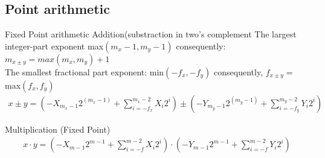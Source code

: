 \subsection{Point arithmetic}
\begin{parag}{Fixed Point arithmetic Addition(substraction in two's complement}
    The largest integer-part exponent max$(m_x - 1, m_y - 1)$ consequently: $m_{x \pm y} = max (m_x, m_y) + 1$
    \\
    The smallest fractional part exponent: min$(-f_x, -f_y)$ consequently, $f_{ x \pm y} = $ max$(f_x, f_y)$
    \begin{align*}
        x \pm y = \left( -X_{m_x-1}2^{(m_x -1)} + \sum_{i=-f_x}^{m_x -2} X_i2^i \right) \pm \left( -Y_{m_y-1}2^{(m_y-1)} + \sum_{i = -f_y}^{m_y -2}Y_i2^i \right)
    \end{align*}
\end{parag}
\begin{parag}{Multiplication (Fixed Point)}
    \begin{align*}
        x \cdot y = \left( -X_{m-1}2^{m-1} + \sum_{i=-f}^{m-2} X_i2^i \right) \cdot \left( -Y_{m-1}2^{m-1} + \sum_{i=-f}^{m-2}Y_i2^i \right)
    \end{align*}
\end{parag} 
